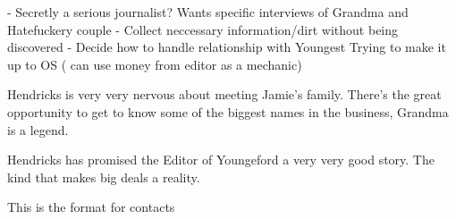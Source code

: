 \documentclass[char]{LRSguildcamp1}
\begin{document}
- Secretly a serious journalist?  Wants specific interviews of Grandma and Hatefuckery couple 
- Collect neccessary information/dirt without being discovered
- Decide how to handle relationship with Youngest 
Trying to make it up to OS ( can use money from editor as a mechanic)

Hendricks is very very nervous about meeting Jamie’s family. There’s the great opportunity to get to know some of the biggest names in the business, Grandma is a legend. 

Hendricks has promised the Editor of Youngeford a very very good story. The kind that makes big deals a reality. 


\begin{itemz}[Goals]
	\item 
\end{itemz}

\begin{itemz}[Notes]
	\item 
\end{itemz}

\begin{contacts}
	\contact{} This is the format for contacts 
\end{contacts}
\end{document}
